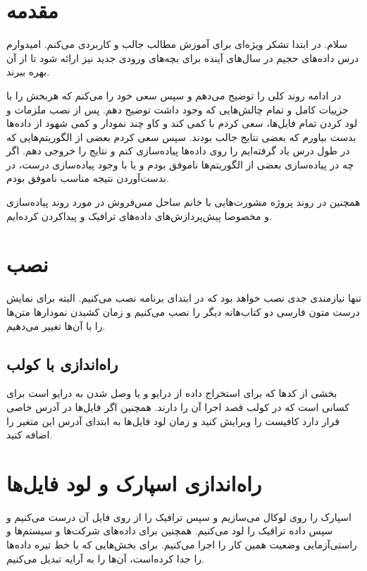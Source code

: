 \documentclass[12pt]{article}
\begin{document}
\graphicspath{ {./} }
\section*{مقدمه}
سلام. در ابتدا تشکر ویژه‌ای برای آموزش مطالب جالب و کاربردی می‌کنم.
امیدوارم درس داده‌های حجیم در سال‌های آینده برای بچه‌های ورودی جدید نیز ارائه شود تا از آن بهره ببرند.

در ادامه روند کلی را توضیح می‌دهم و سپس سعی خود را می‌کنم که هربخش را با جزییات کامل و تمام چالش‌هایی که وجود داشت توضیح دهم.
پس از نصب ملزمات و لود کردن تمام فایل‌ها، سعی کردم با کمی
کند و کاو چند نمودار و کمی شهود از داده‌ها بدست بیاورم که بعضی نتایج جالب بودند.
سپس سعی کردم بعضی از الگوریتم‌هایی که در طول درس یاد گرفته‌ایم را روی داده‌ها پیاده‌سازی کنم و نتایج را خروجی دهم.
اگر چه در پیاده‌سازی بعضی از الگوریتم‌ها ناموفق بودم و یا با وجود پیاده‌سازی درست، در بدست‌آوردن نتیجه مناسب ناموفق بودم.

همچنین  در روند پروژه مشورت‌هایی با خانم ساحل مس‌فروش در مورد روند پیاده‌سازی و 
مخصوصا پیش‌پردازش‌های داده‌های ترافیک و پیدا‌کردن 
کرده‌ایم.


\section*{نصب}
تنها نیازمندی جدی نصب 
خواهد بود که در ابتدای برنامه نصب می‌کنیم.
البته برای نمایش درست متون فارسی دو کتاب‌هانه دیگر را نصب می‌کنیم و زمان کشیدن نمودار‌ها متن‌ها را با آن‌ها تغییر می‌دهیم.

\subsection*{راه‌اندازی با کولب}
بخشی از کد‌ها که برای استخراج داده از درایو و یا وصل شدن به درایو است برای کسانی است که در کولب قصد اجرا آن را دارند.
همچنین اگر فایل‌ها در آدرس خاصی قرار دارد کافیست
را ویرایش کنید و زمان لود فایل‌ها به ابتدای آدرس این متغیر را اضافه کنید.

\section*{راه‌اندازی اسپارک و لود فایل‌ها}
اسپارک را روی لوکال می‌سازیم و سپس 
ترافیک را از روی فایل آن درست می‌کنیم و سپس داده ترافیک را لود می‌کنیم. همچنین برای داده‌های
شرکت‌ها و سیستم‌ها و راستی‌آزمایی وضعیت همین کار را اجرا می‌کنیم. برای بخش‌هایی که با خط تیره داده‌ها را جدا کرده‌است،
آن‌ها را به آرایه تبدیل می‌کنیم.
\end{document}
